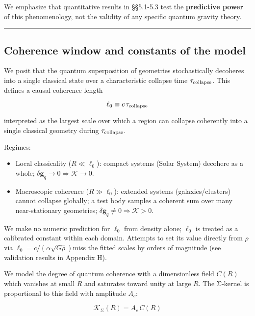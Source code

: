\documentclass[11pt,a4paper]{article}
\begin{document}
We emphasize that quantitative results in §§5.1-5.3 test the \textbf{predictive power} of this phenomenology, not the validity of any specific quantum gravity theory.


\medskip\hrule\medskip


\subsection{Coherence window and constants of the model}


We posit that the quantum superposition of geometries stochastically decoheres into a single classical state over a characteristic collapse time $\tau_{\rm collapse}$. This defines a causal coherence length


\begin{equation}
\ell_0 \equiv c\,\tau_{\rm collapse}
\end{equation}


interpreted as the largest scale over which a region can collapse coherently into a single classical geometry during $\tau_{\rm collapse}$.


Regimes:

\begin{itemize}
\item Local classicality ($R\ll\ell_0$): compact systems (Solar System) decohere as a whole; $\allowbreak \delta\mathbf{g}_q\to0\Rightarrow \mathcal{K}\to0$\allowbreak .
\item Macroscopic coherence ($R\gg\ell_0$): extended systems (galaxies/clusters) cannot collapse globally; a test body samples a coherent sum over many near‑stationary geometries; $\allowbreak \delta\mathbf{g}_q\ne0\Rightarrow \mathcal{K}>0$\allowbreak .
\end{itemize}


We make no numeric prediction for $\ell_0$ from density alone; $\ell_0$ is treated as a calibrated constant within each domain. Attempts to set its value directly from $\rho$ via $\allowbreak \ell_0 = c/(\alpha\sqrt{G\rho})$\allowbreak  miss the fitted scales by orders of magnitude (see validation results in Appendix H).


We model the degree of quantum coherence with a dimensionless field $C(R)$ which vanishes at small $R$ and saturates toward unity at large $R$. The Σ‑kernel is proportional to this field with amplitude $A_c$:


\begin{equation}
\mathcal{K}_\Sigma(R) = A_c\,C(R)
\end{equation}
\end{document}
